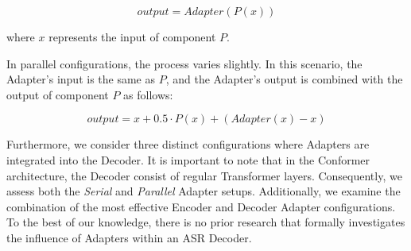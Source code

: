 \begin{equation}
    output =  Adapter(P(x))
\end{equation}

where $x$ represents the input of component $P$.

In parallel configurations, the process varies slightly. In this scenario, the Adapter's input is the same as $P$, and the Adapter's output is combined with the output of component $P$ as follows:

\begin{equation}
    output = x + 0.5 \cdot P(x) + (Adapter(x) - x)
\end{equation}

Furthermore, we consider three distinct configurations where Adapters are integrated into the Decoder. It is important to note that in the Conformer architecture, the Decoder consist of regular Transformer layers. Consequently, we assess both the \textit{Serial} and \textit{Parallel} Adapter setups. Additionally, we examine the combination of the most effective Encoder and Decoder Adapter configurations. To the best of our knowledge, there is no prior research that formally investigates the influence of Adapters within an \ac{ASR} Decoder. 


